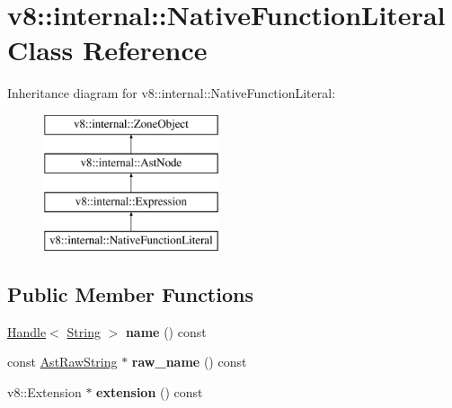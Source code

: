 \hypertarget{classv8_1_1internal_1_1NativeFunctionLiteral}{}\section{v8\+:\+:internal\+:\+:Native\+Function\+Literal Class Reference}
\label{classv8_1_1internal_1_1NativeFunctionLiteral}
Inheritance diagram for v8\+:\+:internal\+:\+:Native\+Function\+Literal\+:\begin{figure}[H]
\begin{center}
\leavevmode
\includegraphics[height=4.000000cm]{classv8_1_1internal_1_1NativeFunctionLiteral}
\end{center}
\end{figure}
\subsection*{Public Member Functions}
\begin{DoxyCompactItemize}
\item 
\mbox{\label{classv8_1_1internal_1_1NativeFunctionLiteral_acfbb4bb68e4061fefec57f87ea162067}} 
\mbox{\hyperlink{classv8_1_1internal_1_1Handle}{Handle}}$<$ \mbox{\hyperlink{classv8_1_1internal_1_1String}{String}} $>$ {\bfseries name} () const
\item 
\mbox{\label{classv8_1_1internal_1_1NativeFunctionLiteral_a9fb23d63c2cf2fc62b8d07d3dd3517ef}} 
const \mbox{\hyperlink{classv8_1_1internal_1_1AstRawString}{Ast\+Raw\+String}} $\ast$ {\bfseries raw\+\_\+name} () const
\item 
\mbox{\label{classv8_1_1internal_1_1NativeFunctionLiteral_a68791118e5bf9c6ae2857f50309abc31}} 
v8\+::\+Extension $\ast$ {\bfseries extension} () const
\end{DoxyCompactItemize}
